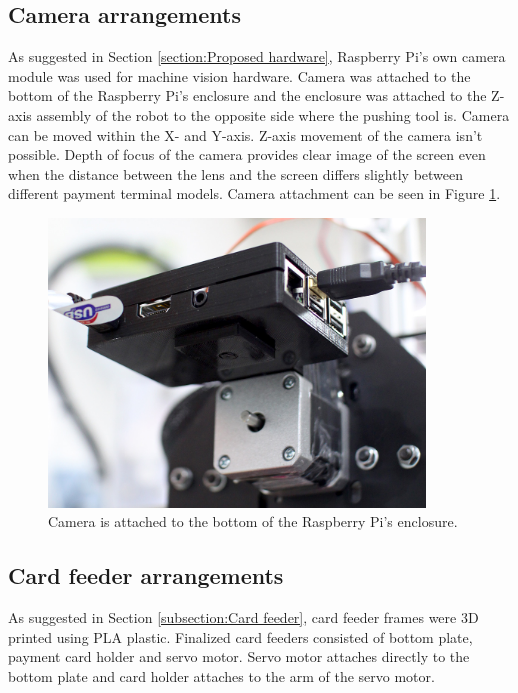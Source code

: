 \subsection{Camera arrangements}
\label{subsection:Camera Arrangements}

As suggested in Section \ref{section:Proposed hardware}, Raspberry Pi's own camera module was used for machine vision hardware. Camera was attached to the bottom of the Raspberry Pi's enclosure and the enclosure was attached to the Z-axis assembly of the robot to the opposite side where the pushing tool is. Camera can be moved within the X- and Y-axis. Z-axis movement of the camera isn't possible. Depth of focus of the camera provides clear image of the screen even when the distance between the lens and the screen differs slightly between different payment terminal models. Camera attachment can be seen in Figure \ref{fig:camera}.

\begin{figure}[ht]
  \begin{center}
    \includegraphics[width=10cm]{images/camera.jpg}
    \caption{Camera is attached to the bottom of the Raspberry Pi's enclosure.}
    \label{fig:camera}
  \end{center}
\end{figure}
\FloatBarrier


\subsection{Card feeder arrangements}
\label{subsection:Card feeder arrangements}

As suggested in Section \ref{subsection:Card feeder}, card feeder frames were 3D printed using PLA plastic. Finalized card feeders consisted of bottom plate, payment card holder and servo motor. Servo motor attaches directly to the bottom plate and card holder attaches to the arm of the servo motor.

